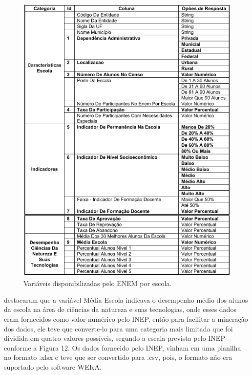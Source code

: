 \begin{figure}[!htp]
	\begin{center}
    \caption{\label{fig:waveform_fig} Variáveis disponibilizadas pelo ENEM por escola.}
	\includegraphics[scale=0.99]{Figuras/Tabela_ENEM.png}
	\end{center}
\end{figure}

\par
{} destacaram que a variável Média Escola indicava o desempenho médio dos alunos da escola na área de ciências da natureza e suas tecnologias, onde esses dados eram fornecidos como valor numérico pelo INEP, então para facilitar a mineração dos dados, ele teve que converte-lo para uma categoria mais limitada que foi dividida em quatro valores possíveis, segundo a escala prevista pelo INEP conforme a Figura 12. Os dados fornecido pelo INEP, vinham em uma planilha no formato .xlsx e teve que ser convertido para .csv, pois, o formato não era suportado pelo software WEKA.


